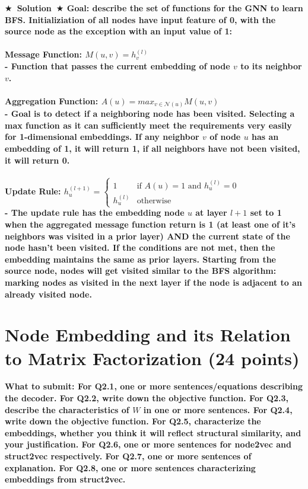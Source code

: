 \documentclass{article}
\numberwithin{figure}{section}
\newcommand{\Solution}[1]{{\medskip \color{red} \bf $\bigstar$~\sf \textbf{Solution}~$\bigstar$ \sf #1 } \bigskip}
\begin{document}
\Solution{ Goal: describe the set of functions for the GNN to learn BFS. Initializiation of all nodes have input feature of 0, with the source node as the exception with an input value of 1:\\
\\
Message Function: $M(u,v) = h_v^{(l)}$
\\
- Function that passes the current embedding of node $v$ to its neighbor $v$. \\\\
Aggregation Function: $A(u) = max_{v \in \mathcal{N}(u)}M(u,v)$\\
- Goal is to detect if a neighboring node has been visited. Selecting a max function as it can sufficiently meet the requirements very easily for 1-dimensional embeddings. If any neighbor $v$ of node $u$ has an embedding of 1, it will return 1, if all neighbors have not been visited, it will return 0.\\\\
Update Rule:
$h^{(l+1)}_u = 
\begin{cases} 
1 & \text{if } A(u) = 1 \text{ and } h^{(l)}_u = 0 \\
h^{(l)}_u & \text{otherwise}
\end{cases}$ \\
- The update rule has the embedding node $u$ at layer $l+1$ set to 1 when the aggregated message function return is 1 (at least one of it's neighbors was visited in a prior layer) AND the current state of the node hasn't been visited. If the conditions are not met, then the embedding maintains the same as prior layers. Starting from the source node, nodes will get visited similar to the BFS algorithm: marking nodes as visited in the next layer if the node is adjacent to an already visited node.

}



\section{Node Embedding and its Relation to Matrix Factorization (24 points)}

\textbf{ What to submit: For Q2.1, one or more sentences/equations describing the decoder. For Q2.2, write down the objective function. For Q2.3, describe the characteristics of $W$ in one or more sentences. For Q2.4, write down the objective function. For Q2.5, characterize the embeddings, whether you think it will reflect structural similarity, and your justification. For Q2.6, one or more sentences for node2vec and struct2vec respectively. For Q2.7, one or more sentences of explanation. For Q2.8, one or more sentences characterizing embeddings from struct2vec.}
\end{document}
